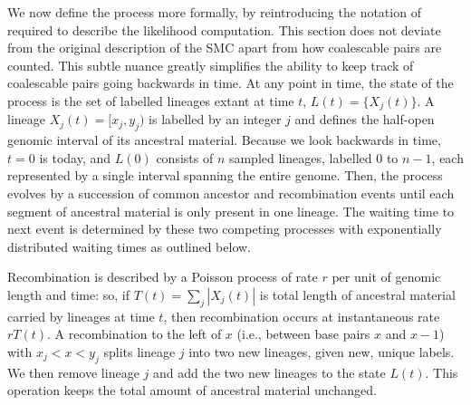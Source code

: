 \documentclass{article}
\begin{document}
We now define the process more formally, by reintroducing
the notation of \citet{mcvean_approximating_2005} required to describe
the likelihood computation. This section
does not deviate from the original description of the SMC apart from
how coalescable pairs are counted. This subtle nuance
greatly simplifies the ability to keep track of coalescable pairs going
backwards in time.
At any point in time, the state of the process is 
the set of labelled lineages extant at time $t$,
$L(t) = \{X_j(t)\}$.
A lineage $X_j(t) = [x_{j}, y_{j})$ is labelled by 
an integer $j$ and defines the 
half-open genomic interval of its ancestral material.
Because we look backwards in time, $t=0$ is today, and 
$L(0)$ consists of $n$ sampled lineages, labelled $0$ to $n-1$,
each represented by a single interval spanning the entire genome.
Then, the process evolves by a succession of common ancestor and recombination
events until each segment of ancestral material is only present in one lineage.
The waiting time to next event is determined by these two competing processes
with exponentially distributed waiting times as outlined below.

Recombination is described by a Poisson process of rate $r$ per unit 
of genomic length and time:
so, if $T(t) = \sum_j |X_j(t)|$ is total length of ancestral material
carried by lineages at time $t$,
then recombination occurs at instantaneous rate $rT(t)$.
A recombination to the left of $x$
(i.e., between base pairs $x$ and $x-1$)
with $x_{j} < x <y_{j}$ splits lineage $j$ into two new lineages,
given new, unique labels. We then remove lineage $j$
and add the two new lineages to the state $L(t)$.
This operation keeps the total amount of ancestral material unchanged.
\end{document}
